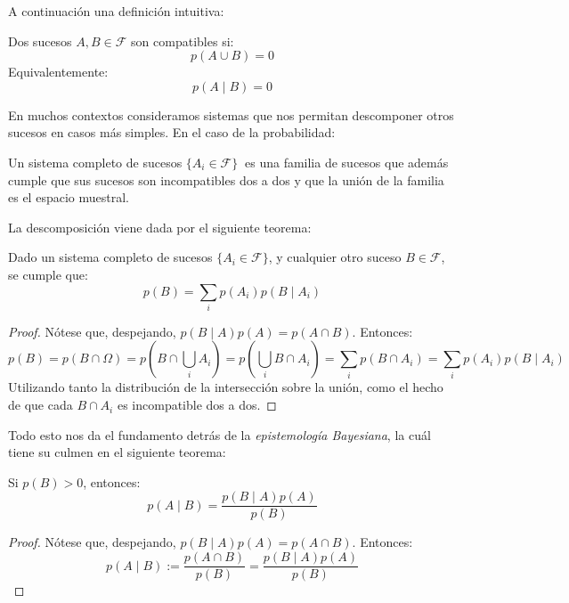 \documentclass[10pt]{article}
\begin{document}
A continuación una definición intuitiva:

\begin{definition}[Compatibilidad]
  Dos sucesos $A, B \in \mathcal{F}$ son compatibles si:
  \[ p(A \cup B) = 0 \]
  Equivalentemente:
  \[ p(A \mid B) = 0 \]
\end{definition}

En muchos contextos consideramos sistemas que nos permitan descomponer otros sucesos en casos más simples. En el caso de la probabilidad:

\begin{definition}
  Un sistema completo de sucesos $ \{ A_i \in \mathcal{F} \}\ $ es una familia de sucesos que además cumple que sus sucesos son incompatibles dos a dos y que la unión
  de la familia es el espacio muestral.
\end{definition}

La descomposición viene dada por el siguiente teorema:

\begin{theorem}
  Dado un sistema completo de sucesos $ \{ A_i \in \mathcal{F} \} $, y cualquier otro suceso $ B \in \mathcal{F} $, se cumple que:
  \[ p(B) = \sum_i p(A_i)p(B \mid A_i) \]
\end{theorem}

\begin{proof}
  Nótese que, despejando, $ p(B \mid A)p(A) = p(A \cap B) $. Entonces:
  \[ p(B) = p(B \cap \Omega) = p(B \cap \bigcup_i A_i) = p(\bigcup_i B \cap A_i) = \sum_i p(B \cap A_i) = \sum_i p(A_i)p(B \mid A_i) \]
  Utilizando tanto la distribución de la intersección sobre la unión, como el hecho de que cada $ B \cap A_i $ es incompatible dos a dos.
\end{proof}

Todo esto nos da el fundamento detrás de la \textit{epistemología Bayesiana}, la cuál tiene su culmen en el siguiente teorema:

\begin{theorem}
  Si $p(B) > 0$, entonces:
  \[ p(A \mid B) = \frac{p(B \mid A)p(A)}{p(B)} \]
\end{theorem}

\begin{proof}
  Nótese que, despejando, $ p(B \mid A)p(A) = p(A \cap B) $. Entonces:
  \[ p(A \mid B) := \frac{p(A \cap B)}{p(B)} = \frac{p(B \mid A)p(A)}{p(B)} \]
\end{proof}
\end{document}
